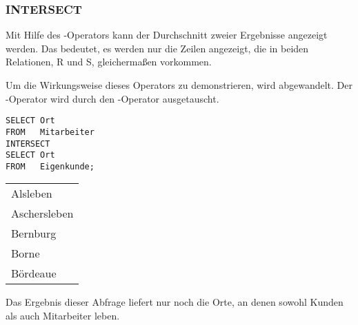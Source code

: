         \subsubsection{INTERSECT}
          Mit Hilfe des -Operators kann der Durchschnitt zweier Ergebnisse angezeigt werden. Das bedeutet, es werden nur die Zeilen angezeigt, die in beiden Relationen, R und S, gleichermaßen vorkommen.

          Um die Wirkungsweise dieses Operators zu demonstrieren, wird  abgewandelt. Der -Operator wird durch den -Operator ausgetauscht.


          \begin{lstlisting}[language=oracle_sql,caption={Orte, an denen sowohl Kunden als auch Mitarbeiter leben},label=sql04_25]
SELECT Ort
FROM   Mitarbeiter
INTERSECT
SELECT Ort
FROM   Eigenkunde;
          \end{lstlisting}
          \begin{center}
            \begin{small}
              \tablehead{}
              \begin{msoraclesql}
                \begin{supertabular}{l}
                  Alsleben \\
                  Aschersleben \\
                  Bernburg \\
                  Borne \\
                  Bördeaue \\
                \end{supertabular}
              \end{msoraclesql}
            \end{small}
          \end{center}
          Das Ergebnis dieser Abfrage liefert nur noch die Orte, an denen sowohl Kunden als auch Mitarbeiter leben.
